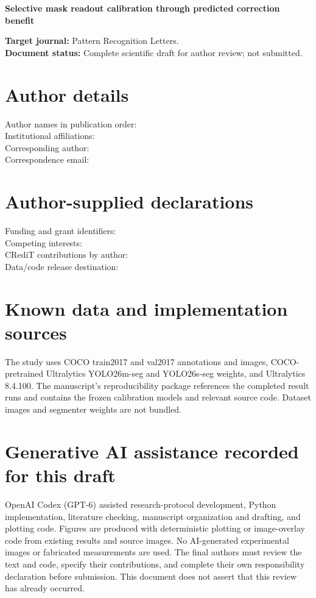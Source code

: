 \documentclass[11pt,a4paper]{article}
\begin{document}
\thispagestyle{empty}
\begin{center}\Large\bfseries
Selective mask readout calibration through predicted correction benefit
\end{center}
\bigskip
\noindent\textbf{Target journal:} Pattern Recognition Letters.\\
\textbf{Document status:} Complete scientific draft for author review; not submitted.

\section*{Author details}
Author names in publication order: \hrulefill\\[1em]
Institutional affiliations: \hrulefill\\[1em]
Corresponding author: \hrulefill\\[1em]
Correspondence email: \hrulefill

\section*{Author-supplied declarations}
Funding and grant identifiers: \hrulefill\\[1em]
Competing interests: \hrulefill\\[1em]
CRediT contributions by author: \hrulefill\\[1em]
Data/code release destination: \hrulefill

\section*{Known data and implementation sources}
The study uses COCO train2017 and val2017 annotations and images, COCO-pretrained Ultralytics YOLO26m-seg and YOLO26s-seg weights, and Ultralytics 8.4.100. The manuscript's reproducibility package references the completed result runs and contains the frozen calibration models and relevant source code. Dataset images and segmenter weights are not bundled.

\section*{Generative AI assistance recorded for this draft}
OpenAI Codex (GPT-6) assisted research-protocol development, Python implementation, literature checking, manuscript organization and drafting, and plotting code. Figures are produced with deterministic plotting or image-overlay code from existing results and source images. No AI-generated experimental images or fabricated measurements are used. The final authors must review the text and code, specify their contributions, and complete their own responsibility declaration before submission. This document does not assert that this review has already occurred.
\end{document}

